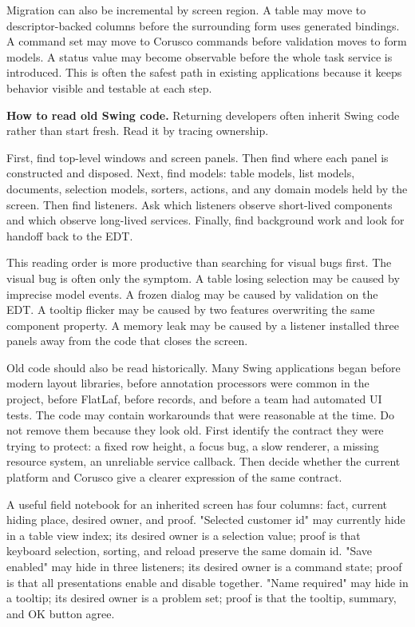 Migration can also be incremental by screen region. A table may move to descriptor-backed columns before the surrounding form uses generated bindings. A command set may move to Corusco commands before validation moves to form models. A status value may become observable before the whole task service is introduced. This is often the safest path in existing applications because it keeps behavior visible and testable at each step.

\textbf{How to read old Swing code.} Returning developers often inherit Swing code rather than start fresh. Read it by tracing ownership.

First, find top-level windows and screen panels. Then find where each panel is constructed and disposed. Next, find models: table models, list models, documents, selection models, sorters, actions, and any domain models held by the screen. Then find listeners. Ask which listeners observe short-lived components and which observe long-lived services. Finally, find background work and look for handoff back to the EDT.

This reading order is more productive than searching for visual bugs first. The visual bug is often only the symptom. A table losing selection may be caused by imprecise model events. A frozen dialog may be caused by validation on the EDT. A tooltip flicker may be caused by two features overwriting the same component property. A memory leak may be caused by a listener installed three panels away from the code that closes the screen.

Old code should also be read historically. Many Swing applications began before modern layout libraries, before annotation processors were common in the project, before FlatLaf, before records, and before a team had automated UI tests. The code may contain workarounds that were reasonable at the time. Do not remove them because they look old. First identify the contract they were trying to protect: a fixed row height, a focus bug, a slow renderer, a missing resource system, an unreliable service callback. Then decide whether the current platform and Corusco give a clearer expression of the same contract.

A useful field notebook for an inherited screen has four columns: fact, current hiding place, desired owner, and proof. "Selected customer id" may currently hide in a table view index; its desired owner is a selection value; proof is that keyboard selection, sorting, and reload preserve the same domain id. "Save enabled" may hide in three listeners; its desired owner is a command state; proof is that all presentations enable and disable together. "Name required" may hide in a tooltip; its desired owner is a problem set; proof is that the tooltip, summary, and OK button agree.

